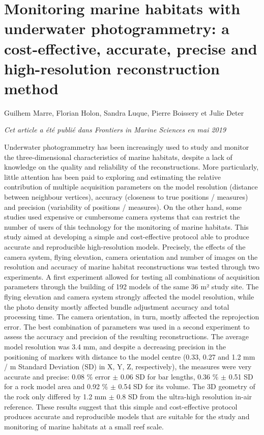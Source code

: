 \chapter{Monitoring marine habitats with underwater photogrammetry: a cost-effective, accurate, precise and high-resolution reconstruction method} \label{chap:c3}

\noindent Guilhem Marre, Florian Holon, Sandra Luque, Pierre Boissery et Julie Deter

\noindent\textit{Cet article a été publié dans Frontiers in Marine Sciences en mai 2019}

Underwater photogrammetry has been increasingly used to study and monitor the three-dimensional characteristics of marine habitats, despite a lack of knowledge on the quality and reliability of the reconstructions. More particularly, little attention has been paid to exploring and estimating the relative contribution of multiple acquisition parameters on the model resolution (distance between neighbour vertices), accuracy (closeness to true positions / measures) and precision (variability of positions / measures). On the other hand, some studies used expensive or cumbersome camera systems that can restrict the number of users of this technology for the monitoring of marine habitats. This study aimed at developing a simple and cost-effective protocol able to produce accurate and reproducible high-resolution models. Precisely, the effects of the camera system, flying elevation, camera orientation and number of images on the resolution and accuracy of marine habitat reconstructions was tested through two experiments. A first experiment allowed for testing all combinations of acquisition parameters through the building of 192 models of the same 36 m² study site. The flying elevation and camera system strongly affected the model resolution, while the photo density mostly affected bundle adjustment accuracy and total processing time. The camera orientation, in turn, mostly affected the reprojection error. The best combination of parameters was used in a second experiment to assess the accuracy and precision of the resulting reconstructions. The average model resolution was 3.4 mm, and despite a decreasing precision in the positioning of markers with distance to the model centre (0.33, 0.27 and 1.2 mm / m Standard Deviation (SD) in X, Y, Z, respectively), the measures were very accurate and precise: 0.08 \% error $\pm$ 0.06 SD for bar lengths, 0.36 \% $\pm$ 0.51 SD for a rock model area and 0.92 \% $\pm$ 0.54 SD for its volume. The 3D geometry of the rock only differed by 1.2 mm $\pm$ 0.8 SD from the ultra-high resolution in-air reference. These results suggest that this simple and cost-effective protocol produces accurate and reproducible models that are suitable for the study and monitoring of marine habitats at a small reef scale.

